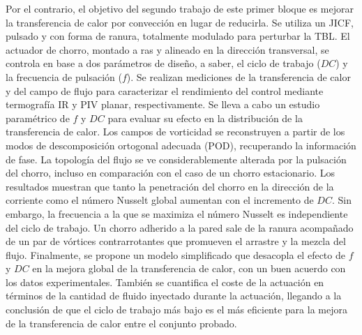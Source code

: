 \begin{abstrakt}
    Por el contrario, el objetivo del segundo trabajo de este primer bloque es mejorar la transferencia de calor por convección en lugar de reducirla. Se utiliza un JICF, pulsado y con forma de ranura, totalmente modulado para perturbar la TBL. El actuador de chorro, montado a ras y alineado en la dirección transversal, se controla en base a dos parámetros de diseño, a saber, el ciclo de trabajo ($DC$) y la frecuencia de pulsación ($f$). Se realizan mediciones de la transferencia de calor y del campo de flujo para caracterizar el rendimiento del control mediante termografía IR y PIV planar, respectivamente. Se lleva a cabo un estudio paramétrico de $f$ y $DC$ para evaluar su efecto en la distribución de la transferencia de calor. Los campos de vorticidad se reconstruyen a partir de los modos de descomposición ortogonal adecuada (POD), recuperando la información de fase. La topología del flujo se ve considerablemente alterada por la pulsación del chorro, incluso en comparación con el caso de un chorro estacionario. Los resultados muestran que tanto la penetración del chorro en la dirección de la corriente como el número Nusselt global aumentan con el incremento de $DC$. Sin embargo, la frecuencia a la que se maximiza el número Nusselt es independiente del ciclo de trabajo. Un chorro adherido a la pared sale de la ranura acompañado de un par de vórtices contrarrotantes que promueven el arrastre y la mezcla del flujo. Finalmente, se propone un modelo simplificado que desacopla el efecto de $f$ y $DC$ en la mejora global de la transferencia de calor, con un buen acuerdo con los datos experimentales. También se cuantifica el coste de la actuación en términos de la cantidad de fluido inyectado durante la actuación, llegando a la conclusión de que el ciclo de trabajo más bajo es el más eficiente para la mejora de la transferencia de calor entre el conjunto probado.


\end{abstrakt}
